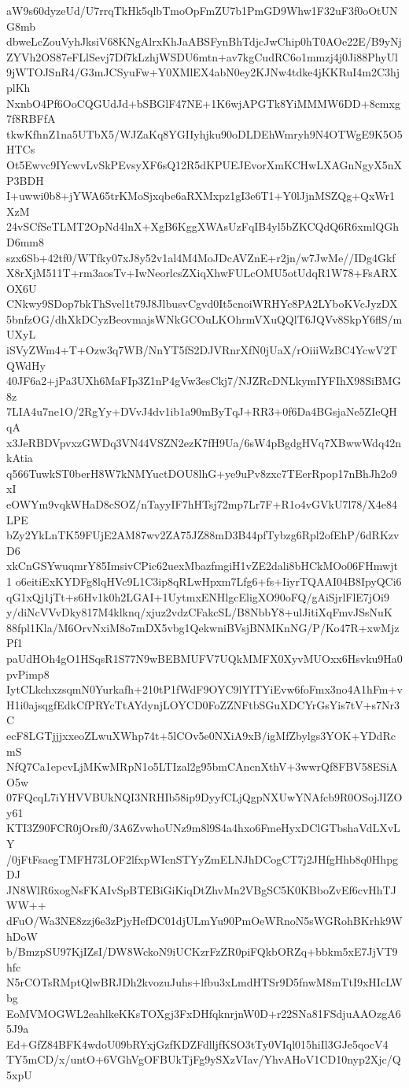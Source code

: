 aW9s60dyzeUd/U7rrqTkHk5qlbTmoOpFmZU7b1PmGD9Whw1F32uF3f0oOtUNG8mb
dbweLcZouVyhJksiV68KNgAlrxKhJaABSFynBhTdjcJwChip0hT0AOe22E/B9yNj
ZYVh2OS87eFLlSevj7Df7kLzhjWSDU6mtn+av7kgCudRC6o1mmzj4j0Ji88PhyUl
9jWTOJSnR4/G3mJCSyuFw+Y0XMlEX4abN0ey2KJNw4tdke4jKKRuI4m2C3hjplKh
NxnbO4Pf6OoCQGUdJd+bSBGlF47NE+1K6wjAPGTk8YiMMMW6DD+8cmxg7f8RBFfA
tkwKfhnZ1na5UTbX5/WJZaKq8YGIIyhjku90oDLDEhWmryh9N4OTWgE9K5O5HTCs
Ot5Ewvc9IYcwvLvSkPEvsyXF6sQ12R5dKPUEJEvorXmKCHwLXAGnNgyX5nXP3BDH
I+uwwi0b8+jYWA65trKMoSjxqbe6aRXMxpz1gI3e6T1+Y0lJjnMSZQg+QxWr1XzM
24vSCfSeTLMT2OpNd4lnX+XgB6KggXWAsUzFqIB4yl5bZKCQdQ6R6xmlQGhD6mm8
szx6Sb+42tf0/WTfky07xJ8y52v1al4M4MoJDcAVZnE+r2jn/w7JwMe//IDg4Gkf
X8rXjM511T+rm3aosTv+IwNeorlcsZXiqXhwFULcOMU5otUdqR1W78+FsARXOX6U
CNkwy9SDop7bkThSvel1t79J8JlbusvCgvd0It5cnoiWRHYc8PA2LYboKVcJyzDX
5bnfzOG/dhXkDCyzBeovmajsWNkGCOuLKOhrmVXuQQlT6JQVv8SkpY6flS/mUXyL
iSVyZWm4+T+Ozw3q7WB/NnYT5fS2DJVRnrXfN0jUaX/rOiiiWzBC4YcwV2TQWdHy
40JF6a2+jPa3UXh6MaFIp3Z1nP4gVw3esCkj7/NJZRcDNLkymIYFIhX98SiBMG8z
7LIA4u7ne1O/2RgYy+DVvJ4dv1ib1a90mByTqJ+RR3+0f6Da4BGsjaNe5ZIeQHqA
x3JeRBDVpvxzGWDq3VN44VSZN2ezK7fH9Ua/6sW4pBgdgHVq7XBwwWdq42nkAtia
q566TuwkST0berH8W7kNMYuctDOU8lhG+ye9uPv8zxc7TEerRpop17nBhJh2o9xI
eOWYm9vqkWHaD8cSOZ/nTayyIF7hHTsj72mp7Lr7F+R1o4vGVkU7l78/X4e84LPE
bZy2YkLnTK59FUjE2AM87wv2ZA75JZ88mD3B44pfTybzg6Rpl2ofEhP/6dRKzvD6
xkCnGSYwuqmrY85ImsivCPic62uexMbazfmgiH1vZE2dali8bHCkMOo06FHmwjt1
o6eitiExKYDFg8lqHVc9L1C3ip8qRLwHpxm7Lfg6+fs+IiyrTQAAI04B8IpyQCi6
qG1xQj1jTt+s6Hv1k0h2LGAI+1UytmxENHlgcEligXO90oFQ/gAiSjrlFlE7jOi9
y/diNcVVvDky817M4klknq/xjuz2vdzCFakcSL/B8NbbY8+ulJitiXqFmvJSsNuK
88fpl1Kla/M6OrvNxiM8o7mDX5vbg1QekwniBVsjBNMKnNG/P/Ko47R+xwMjzPf1
paUdHOh4gO1HSqsR1S77N9wBEBMUFV7UQkMMFX0XyvMUOxx6Hsvku9Ha0pvPimp8
IytCLkchxzsqmN0Yurkafh+210tP1fWdF9OYC9lYITYiEvw6foFmx3no4A1hFm+v
H1i0ajsqgfEdkCfPRYcTtAYdynjLOYCD0FoZZNFtbSGuXDCYrGsYis7tV+s7Nr3C
ecF8LGTjjjxxeoZLwuXWhp74t+5lCOv5e0NXiA9xB/igMfZbylgs3YOK+YDdRcmS
NfQ7Ca1epcvLjMKwMRpN1o5LTIzal2g95bmCAncnXthV+3wwrQf8FBV58ESiAO5w
07FQcqL7iYHVVBUkNQI3NRHIb58ip9DyyfCLjQgpNXUwYNAfcb9R0OSojJIZOy61
KTI3Z90FCR0jOrsf0/3A6ZvwhoUNz9m8l9S4a4hxo6FmeHyxDClGTbshaVdLXvLY
/0jFtFsaegTMFH73LOF2lfxpWIcnSTYyZmELNJhDCogCT7j2JHfgHhb8q0HhpgDJ
JN8WlR6xogNsFKAIvSpBTEBiGiKiqDtZhvMn2VBgSC5K0KBboZvEf6cvHhTJWW++
dFuO/Wa3NE8zzj6e3zPjyHefDC01djULmYu90PmOeWRnoN5sWGRohBKrhk9WhDoW
b/BmzpSU97KjIZsI/DW8WckoN9iUCKzrFzZR0piFQkbORZq+bbkm5xE7JjVT9hfc
N5rCOTsRMptQlwBRJDh2kvozuJuhs+lfbu3xLmdHTSr9D5fnwM8mTtI9xHIcLWbg
EoMVMOGWL2eahlkeKKsTOXgj3FxDHfqknrjnW0D+r22SNa81FSdjuAAOzgA65J9a
Ed+GfZ84BFK4wdoU09bRYxjGzfKDZFdlljfKSO3tTy0VIql015hiIl3GJe5qocV4
TY5mCD/x/untO+6VGhVgOFBUkTjFg9ySXzVIav/YhvAHoV1CD10nyp2Xjc/Q5xpU
